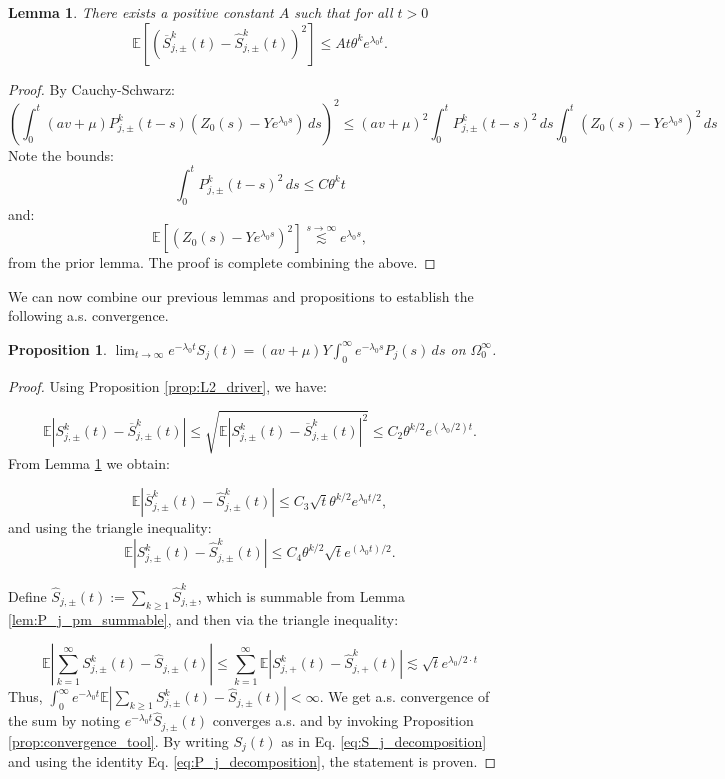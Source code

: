 \documentclass{article}
\numberwithin{equation}{section}
\newtheorem{lemma}{Lemma}
\newtheorem{proposition}{Proposition}
\newcommand{\lsimas}[2]{\overset{{#1}\to {#2}}{\lesssim}}
\begin{document}
\begin{lemma}\label{lem:pm_approx_via_Y}
There exists a positive constant $A$ such that for all $t>0$
\[
\mathbb{E}\left[(\overline{S}_{j,\pm}^{k}(t)-\widehat{S}_{j,\pm}^{k}(t))^2\right]\leq At\theta^ke^{\lambda_0 t}.
\]
\end{lemma}

\begin{proof}
  By Cauchy-Schwarz:
  \[\left(\int_0^t (av+\mu)P_{j,\pm}^{k}(t-s)(Z_0(s)-Ye^{\lambda_0 s})\,ds\right)^2\leq (av+\mu)^2\int_0^t P_{j,\pm}^{k}(t-s)^2\,ds\int_0^t (Z_0(s)-Ye^{\lambda_0 s})^2\,ds\]
  Note the bounds:
  \[\int_0^t P_{j,\pm}^{k}(t-s)^2\,ds\leq C\theta^k t\]
  and:
  \[\mathbb{E}\left[\left(Z_0(s)-Ye^{\lambda_0 s}\right)^2\right]\lsimas{s}{\infty}e^{\lambda_0 s},\]
  from the prior lemma. The proof is complete combining the above.
\end{proof}

We can now combine our previous lemmas and propositions to establish the following a.s. convergence.

\begin{proposition}
  $\lim_{t\to\infty} e^{-\lambda_0 t}S_j(t)=(av+\mu)Y\int_0^\infty e^{-\lambda_0 s}P_j(s)\,ds$ on $\Omega_0^\infty$.\label{prop:almost_sure_conv}
\end{proposition}

\begin{proof}
  Using Proposition \ref{prop:L2_driver}, we have:

    \[\mathbb{E}\left|S_{j,\pm}^{k}(t)-\overline{S}_{j,\pm}^{k}(t)\right|\leq \sqrt{\mathbb{E}\left|S_{j,\pm}^{k}(t)-\overline{S}_{j,\pm}^{k}(t)\right|^2}\leq C_2\theta^{k/2}e^{(\lambda_0/2) t}.\]
From Lemma \ref{lem:pm_approx_via_Y} we obtain:

\[\mathbb{E}\left|\overline{S}_{j,\pm}^{k}(t)-\widehat{S}_{j,\pm}^{k}(t)\right|\leq C_3\sqrt{t}\theta^{k/2}e^{\lambda_0 t/2},\]
and using the triangle inequality:
\[\mathbb{E}\left|S_{j,\pm}^{k}(t)-\widehat{S}_{j,\pm}^{k}(t)\right|\leq C_4 \theta^{k/2}\sqrt{t}e^{(\lambda_0t)/2}.\]

Define $\widehat{S}_{j,\pm}(t):=\sum_{k\geq 1}\widehat{S}_{j,\pm}^{k}$, which is summable from Lemma \ref{lem:P_j_pm_summable}, and then via the triangle inequality:

\[\mathbb{E}\left|\sum_{k=1}^\infty S_{j,\pm}^{k}(t)-\widehat{S}_{j,\pm}(t)\right|\leq \sum_{k=1}^\infty \mathbb{E}\left|S_{j,+}^{k}(t)-\widehat{S}_{j,+}^{k}(t)\right|\lesssim\sqrt{t}e^{\lambda_0/2\cdot t}\]
Thus, $\int_0^\infty e^{-\lambda_0 t}\mathbb{E}\left|\sum_{k\geq 1}S_{j,\pm}^{k}(t)-\widehat{S}_{j,\pm}(t)\right|<\infty$. We get a.s. convergence of the sum by noting $e^{-\lambda_0 t}\widehat{S}_{j,\pm}(t)$ converges a.s. and by invoking Proposition \ref{prop:convergence_tool}. By writing $S_j(t)$ as in Eq. \ref{eq:S_j_decomposition} and using the identity Eq. \ref{eq:P_j_decomposition}, the statement is proven.
\end{proof}
\end{document}
